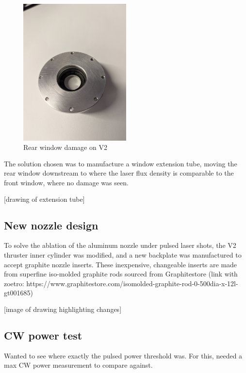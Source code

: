             \begin{figure}[!ht]
                \centering
                \includegraphics[width=0.5\textwidth]{assets/4 experiments/window damage.jpg}
                \caption{Rear window damage on V2}
            \end{figure}

            The solution chosen was to manufacture a window extension tube, moving the rear window downstream to where the laser flux density is comparable to the front window, where no damage was seen.

            [drawing of extension tube]

        \subsection{New nozzle design}
            
            To solve the ablation of the aluminum nozzle under pulsed laser shots, the V2 thruster inner cylinder was modified, and a new backplate was manufactured to accept graphite nozzle inserts. These inexpensive, changeable inserts are made from superfine iso-molded graphite rods sourced from Graphitestore (link with zoetro: https://www.graphitestore.com/isomolded-graphite-rod-0-500dia-x-12l-gt001685)

            [image of drawing highlighting changes]

        \subsection{CW power test}

            Wanted to see where exactly the pulsed power threshold was. For this, needed a max CW power measurement to compare against. 

